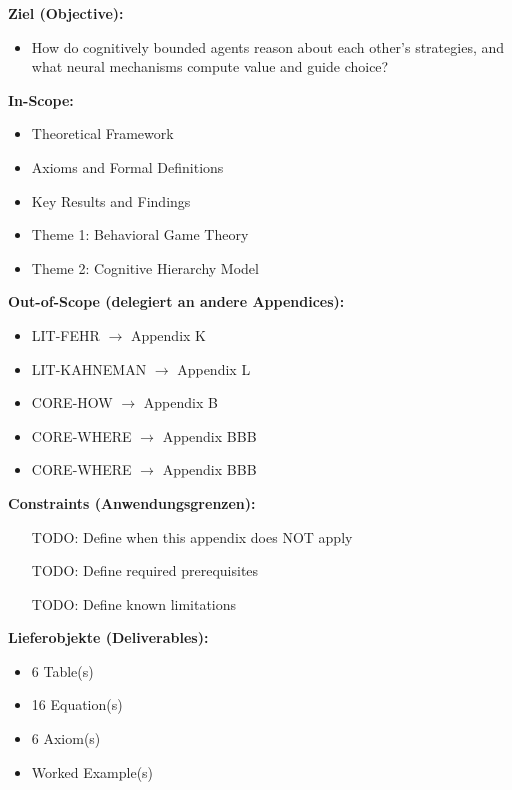 \begin{tcolorbox}[
    colback=orange!5!white,
    colframe=orange!75!black,
    title={\textbf{Appendix Scope: Ziel / In-Scope / Out-of-Scope / Constraints}},
    fonttitle=\bfseries
]

\textbf{Ziel (Objective):}
\begin{itemize}[nosep]
    \item How do cognitively bounded agents reason about each other's strategies, and what neural mechanisms compute value and guide choice?
\end{itemize}

\textbf{In-Scope:}
\begin{itemize}[nosep]
    \item Theoretical Framework
    \item Axioms and Formal Definitions
    \item Key Results and Findings
    \item Theme 1: Behavioral Game Theory
    \item Theme 2: Cognitive Hierarchy Model
\end{itemize}

\textbf{Out-of-Scope (delegiert an andere Appendices):}
\begin{itemize}[nosep]
    \item LIT-FEHR $\rightarrow$ Appendix K
    \item LIT-KAHNEMAN $\rightarrow$ Appendix L
    \item CORE-HOW $\rightarrow$ Appendix B
    \item CORE-WHERE $\rightarrow$ Appendix BBB
    \item CORE-WHERE $\rightarrow$ Appendix BBB
\end{itemize}

\textbf{Constraints (Anwendungsgrenzen):}
\begin{itemize}[nosep]
    \item [TODO: Define when this appendix does NOT apply]
    \item [TODO: Define required prerequisites]
    \item [TODO: Define known limitations]
\end{itemize}

\textbf{Lieferobjekte (Deliverables):}
\begin{itemize}[nosep]
    \item 6 Table(s)
    \item 16 Equation(s)
    \item 6 Axiom(s)
    \item Worked Example(s)
\end{itemize}

\end{tcolorbox}




